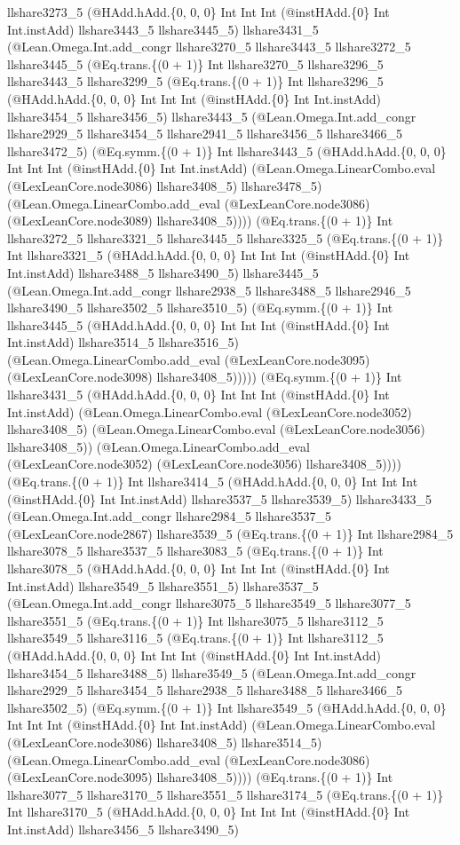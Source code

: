 \documentclass[11pt]{article}
\begin{document}
llshare3273\_5 (@HAdd.hAdd.\{0, 0, 0\} Int Int Int (@instHAdd.\{0\} Int Int.instAdd) llshare3443\_5 llshare3445\_5) llshare3431\_5 (@Lean.Omega.Int.add\_congr llshare3270\_5 llshare3443\_5 llshare3272\_5 llshare3445\_5 (@Eq.trans.\{(0 + 1)\} Int llshare3270\_5 llshare3296\_5 llshare3443\_5 llshare3299\_5 (@Eq.trans.\{(0 + 1)\} Int llshare3296\_5 (@HAdd.hAdd.\{0, 0, 0\} Int Int Int (@instHAdd.\{0\} Int Int.instAdd) llshare3454\_5 llshare3456\_5) llshare3443\_5 (@Lean.Omega.Int.add\_congr llshare2929\_5 llshare3454\_5 llshare2941\_5 llshare3456\_5 llshare3466\_5 llshare3472\_5) (@Eq.symm.\{(0 + 1)\} Int llshare3443\_5 (@HAdd.hAdd.\{0, 0, 0\} Int Int Int (@instHAdd.\{0\} Int Int.instAdd) (@Lean.Omega.LinearCombo.eval (@LexLeanCore.node3086) llshare3408\_5) llshare3478\_5) (@Lean.Omega.LinearCombo.add\_eval (@LexLeanCore.node3086) (@LexLeanCore.node3089) llshare3408\_5)))) (@Eq.trans.\{(0 + 1)\} Int llshare3272\_5 llshare3321\_5 llshare3445\_5 llshare3325\_5 (@Eq.trans.\{(0 + 1)\} Int llshare3321\_5 (@HAdd.hAdd.\{0, 0, 0\} Int Int Int (@instHAdd.\{0\} Int Int.instAdd) llshare3488\_5 llshare3490\_5) llshare3445\_5 (@Lean.Omega.Int.add\_congr llshare2938\_5 llshare3488\_5 llshare2946\_5 llshare3490\_5 llshare3502\_5 llshare3510\_5) (@Eq.symm.\{(0 + 1)\} Int llshare3445\_5 (@HAdd.hAdd.\{0, 0, 0\} Int Int Int (@instHAdd.\{0\} Int Int.instAdd) llshare3514\_5 llshare3516\_5) (@Lean.Omega.LinearCombo.add\_eval (@LexLeanCore.node3095) (@LexLeanCore.node3098) llshare3408\_5))))) (@Eq.symm.\{(0 + 1)\} Int llshare3431\_5 (@HAdd.hAdd.\{0, 0, 0\} Int Int Int (@instHAdd.\{0\} Int Int.instAdd) (@Lean.Omega.LinearCombo.eval (@LexLeanCore.node3052) llshare3408\_5) (@Lean.Omega.LinearCombo.eval (@LexLeanCore.node3056) llshare3408\_5)) (@Lean.Omega.LinearCombo.add\_eval (@LexLeanCore.node3052) (@LexLeanCore.node3056) llshare3408\_5)))) (@Eq.trans.\{(0 + 1)\} Int llshare3414\_5 (@HAdd.hAdd.\{0, 0, 0\} Int Int Int (@instHAdd.\{0\} Int Int.instAdd) llshare3537\_5 llshare3539\_5) llshare3433\_5 (@Lean.Omega.Int.add\_congr llshare2984\_5 llshare3537\_5 (@LexLeanCore.node2867) llshare3539\_5 (@Eq.trans.\{(0 + 1)\} Int llshare2984\_5 llshare3078\_5 llshare3537\_5 llshare3083\_5 (@Eq.trans.\{(0 + 1)\} Int llshare3078\_5 (@HAdd.hAdd.\{0, 0, 0\} Int Int Int (@instHAdd.\{0\} Int Int.instAdd) llshare3549\_5 llshare3551\_5) llshare3537\_5 (@Lean.Omega.Int.add\_congr llshare3075\_5 llshare3549\_5 llshare3077\_5 llshare3551\_5 (@Eq.trans.\{(0 + 1)\} Int llshare3075\_5 llshare3112\_5 llshare3549\_5 llshare3116\_5 (@Eq.trans.\{(0 + 1)\} Int llshare3112\_5 (@HAdd.hAdd.\{0, 0, 0\} Int Int Int (@instHAdd.\{0\} Int Int.instAdd) llshare3454\_5 llshare3488\_5) llshare3549\_5 (@Lean.Omega.Int.add\_congr llshare2929\_5 llshare3454\_5 llshare2938\_5 llshare3488\_5 llshare3466\_5 llshare3502\_5) (@Eq.symm.\{(0 + 1)\} Int llshare3549\_5 (@HAdd.hAdd.\{0, 0, 0\} Int Int Int (@instHAdd.\{0\} Int Int.instAdd) (@Lean.Omega.LinearCombo.eval (@LexLeanCore.node3086) llshare3408\_5) llshare3514\_5) (@Lean.Omega.LinearCombo.add\_eval (@LexLeanCore.node3086) (@LexLeanCore.node3095) llshare3408\_5)))) (@Eq.trans.\{(0 + 1)\} Int llshare3077\_5 llshare3170\_5 llshare3551\_5 llshare3174\_5 (@Eq.trans.\{(0 + 1)\} Int llshare3170\_5 (@HAdd.hAdd.\{0, 0, 0\} Int Int Int (@instHAdd.\{0\} Int Int.instAdd) llshare3456\_5 llshare3490\_5) 
\end{document}
